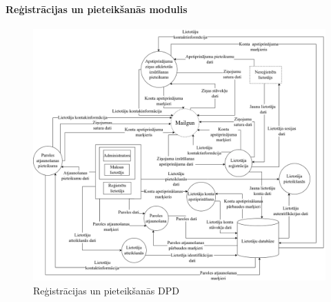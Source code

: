\paragraph{Reģistrācijas un pieteikšanās modulis}

\begin{figure}[htbp]
	\centering
	\includegraphics[width=\linewidth]{./src/img/ReģistrācijasPieteikšanāsModulis.png}
	\caption{Reģistrācijas un pieteikšanās DPD}
	\label{fig:dpd-2-auth}
\end{figure}








